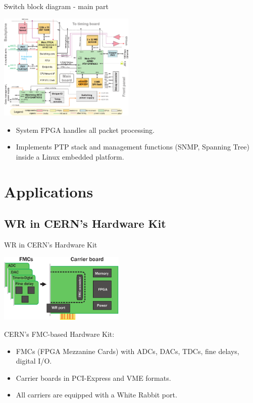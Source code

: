 \documentclass[compress,red]{beamer}
\begin{document}
\begin{frame}{Switch block diagram - main part}
\begin{center}
\includegraphics[width=6.5cm]{sw_block.pdf}
\end{center}
\begin{itemize}
\item System FPGA handles all packet processing.
\item Implements PTP stack and management functions (SNMP, Spanning Tree) 
   inside a Linux embedded platform.
\end{itemize}
\end{frame}

\section{Applications}

\subsection{WR in CERN's Hardware Kit}

\begin{frame}{WR in CERN's Hardware Kit}
\begin{center}

  \includegraphics[width=6cm]{shw_kit.pdf}

  \begin{block}{CERN's FMC-based Hardware Kit:}
    \begin{itemize}
    \item FMCs (FPGA Mezzanine Cards) with ADCs, DACs, TDCs, fine delays, digital I/O.
    \item Carrier boards in PCI-Express and VME formats.
    \item All carriers are equipped with a White Rabbit port.
    \end{itemize}
  \end{block}

\end{center}
\end{frame}
\end{document}
